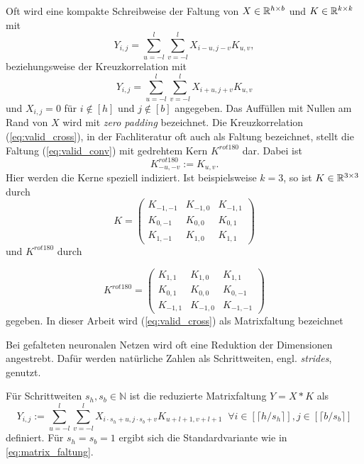 \begin{bem}
    \label{bem:K_conv_komp}
    Oft wird eine kompakte Schreibweise der Faltung von $X \in \mathbb{R}^{h \times b}$ und $ K \in \mathbb{R}^{k \times k}$ mit 
    \begin{equation}
        \label{eq:valid_conv}
        Y_{i,j}=\sum_{u=-l}^l \sum_{v=-l}^l X_{i-u,j-v}K_{u,v},
    \end{equation} beziehungsweise der Kreuzkorrelation mit
    \begin{equation}
        \label{eq:valid_cross}
        Y_{i,j}=\sum_{u=-l}^l \sum_{v=-l}^l X_{i+u,j+v}K_{u,v}
    \end{equation}
    und $X_{i,j}=0$ für $i \notin [h]$ und $j \notin [b]$ angegeben. Das Auffüllen mit Nullen am Rand von $X$ wird mit \textit{zero padding} bezeichnet. Die Kreuzkorrelation (\ref{eq:valid_cross}), in der Fachliteratur oft auch als Faltung bezeichnet, stellt die Faltung (\ref{eq:valid_conv}) mit gedrehtem Kern $K^{rot180}$ dar. Dabei ist 
    \begin{equation*}
        K^{rot180}_{-u,-v}:=K_{u,v}.
    \end{equation*}
    Hier werden die Kerne speziell indiziert. Ist beispielsweise $k=3$, so ist $K \in \mathbb{R}^{3 \times 3}$ durch
    \begin{equation*}
        K=\begin{pmatrix}
            K_{-1,-1} &K_{-1,0} &K_{-1,1} \\
            K_{0,-1} &K_{0,0} &K_{0,1}  \\
            K_{1,-1} &K_{1,0} &K_{1,1} 
        \end{pmatrix}
    \end{equation*} und $K^{rot180}$ durch

    \begin{equation*}
        K^{rot180}=\begin{pmatrix}
            K_{1,1} &K_{1,0} &K_{1,1} \\
            K_{0,1} &K_{0,0} &K_{0,-1}  \\
            K_{-1,1} &K_{-1,0} &K_{-1,-1} 
        \end{pmatrix}
    \end{equation*}
    gegeben. In dieser Arbeit wird (\ref{eq:valid_cross}) als Matrixfaltung bezeichnet
\end{bem}

Bei gefalteten neuronalen Netzen wird oft eine Reduktion der Dimensionen angestrebt. Dafür werden natürliche Zahlen als Schrittweiten, engl. \textit{strides}, genutzt.
\begin{bem}\label{bem_strides}
    Für Schrittweiten $s_h, s_b \in \mathbb{N}$ ist die reduzierte Matrixfaltung $Y=X \ast K$ als
    \begin{equation*}
        Y_{i,j}:=\sum_{u=-l}^{l} \sum_{v=-l}^{l} X_{i \cdot s_h +u,j \cdot s_b +v} K_{u+l+1, v+l+1}\; \; \forall i \in [\lceil h/s_h \rceil], j \in [\lceil b/s_b \rceil]
    \end{equation*}
    definiert.
    Für $s_h=s_b=1$ ergibt sich die Standardvariante wie in \ref{eq:matrix_faltung}.
    \end{bem}

